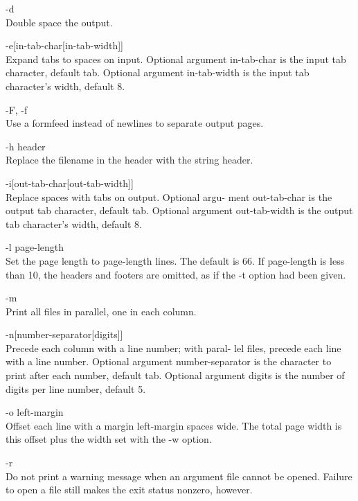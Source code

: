 \begin{description}
       -d      \\
              Double space the output.

       -e[in-tab-char[in-tab-width]] \\
              Expand  tabs to spaces on input.  Optional argument
              in-tab-char is the  input  tab  character,  default
              tab.   Optional  argument in-tab-width is the input
              tab character's width, default 8.

       -F, -f  \\
              Use a formfeed instead of newlines to separate output pages.

       -h header \\
              Replace  the filename in the header with the string
              header.

       -i[out-tab-char[out-tab-width]] \\
              Replace spaces with tabs on output.  Optional argu-
              ment  out-tab-char  is  the  output  tab character,
              default tab.  Optional  argument  out-tab-width  is
              the output tab character's width, default 8.

       -l page-length \\
              Set  the  page  length  to  page-length lines.  The
              default is 66.  If page-length is less than 10, the
              headers  and  footers  are  omitted,  as  if the -t
              option had been given.

       -m      \\
              Print all files in parallel, one in each column.

       -n[number-separator[digits]] \\
              Precede each column with a line number; with paral-
              lel  files,  precede  each line with a line number.
              Optional argument number-separator is the character
              to  print after each number, default tab.  Optional
              argument digits is the number of  digits  per  line
              number, default 5.

       -o left-margin \\
              Offset  each  line with a margin left-margin spaces
              wide.  The total page width is this offset plus the
              width set with the -w option.

       -r      \\
              Do  not  print  a  warning message when an argument
              file cannot be opened.   Failure  to  open  a  file
              still makes the exit status nonzero, however.


\end{description}
